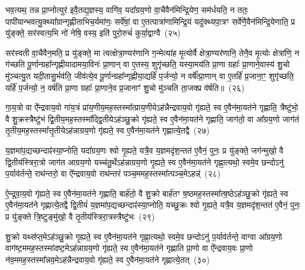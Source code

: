 भव॒त्यथ॒ तन्न प्रा॒प्नोत्युर॑ इवै॒तद्य॒ज्ञस्य॒ वागि॑व॒ यदा᳚ग्रय॒णो वा॒चैवैन॑मिन्द्रि॒येण॒ सम॑र्धयति॒ न ततः॒ पापी॑यान्भव\-त्यु॒क्थ्या᳚ग्रान्गृह्णीताभिच॒र्यमा॑णः॒ सर्वे॑षां॒ वा ए॒तत्पात्रा॑णामिन्द्रि॒यं यदु॑क्थ्यपा॒त्रꣳ सर्वे॑णै॒वैन॑मिन्द्रि॒येणाति॒ प्र यु॑ङ्क्ते॒ सर॑स्वत्य॒भि नो॑ नेषि॒ वस्य॒ इति॑ पुरो॒रुचं॑ कुर्या॒द्वाग्वै~(२५)\ip

सर॑स्वती वा॒चैवैन॒मति॒ प्र यु॑ङ्क्ते॒ मा त्वत्क्षेत्रा॒ण्यर॑णानि ग॒न्मेत्या॑ह मृ॒त्योर्वै क्षेत्रा॒ण्यर॑णानि॒ तेनै॒व मृ॒त्योः क्षेत्रा॑णि॒ न ग॑च्छति पू॒र्णान्ग्रहा᳚न्गृह्णीयादामया॒विनः॑ प्रा॒णान् वा ए॒तस्य॒ शुगृ॑च्छति॒ यस्या॒मय॑ति प्रा॒णा ग्रहाः᳚ प्रा॒णाने॒वास्य॑ शु॒चो मु॑ञ्चत्यु॒त यदी॒तासु॒र्भव॑ति॒ जीव॑त्ये॒व पू॒र्णान्ग्रहा᳚न्गृह्णीया॒द्यर्\mbox{}हि॑ प॒र्जन्यो॒ न वर्\mbox{}षे᳚त्प्रा॒णान् वा ए॒तर्\mbox{}हि॑ प्र॒जाना॒ꣳ॒ शुगृ॑च्छति॒ यर्\mbox{}हि॑ प॒र्जन्यो॒ न॒ वर्\mbox{}ष॑ति प्रा॒णा ग्रहाः᳚ प्रा॒णाने॒व प्र॒जानाꣳ॑ शु॒चो मु॑ञ्चति ता॒जक्प्र व॑र्\mbox{}षति॥~(२६)\ip

{\anuvakamend[{प्र॒मीये॑त मनु॒ष्य॑ ऋध्यते॒ यस्य॑ पि॒ता पि॑ताम॒हः पुण्यो॒ वाग्वा ए॒व पू॒र्णान्ग्रहा॒न्पञ्च॑विꣳशतिश्च}]}

गा॒य॒त्रो वा ऐ᳚न्द्रवाय॒वो गा॑य॒त्रं प्रा॑य॒णीय॒मह॒स्तस्मा᳚त्प्राय॒णीये\-ऽह॑न्नैन्द्रवाय॒वो गृ॑ह्यते॒ स्व ए॒वैन॑मा॒यत॑ने गृह्णाति॒ त्रैष्टु॑भो॒ वै शु॒क्रस्त्रैष्टु॑भं द्वि॒तीय॒मह॒स्तस्मा᳚द्\-द्वि॒तीये\-ऽह॑ञ्छु॒क्रो गृ॑ह्यते॒ स्व ए॒वैन॑मा॒यत॑ने गृह्णाति॒ जाग॑तो॒ वा आ᳚ग्रय॒णो जाग॑तं तृ॒तीय॒मह॒स्तस्मा᳚त्तृ॒तीये\-ऽह॑न्नाग्रय॒णो गृ॑ह्यते॒ स्व ए॒वैन॑मा॒यत॑ने गृह्णात्ये॒तद्वै~(२७)\ip

य॒ज्ञमा॑प॒द्यच्छन्दाꣴ॑स्या॒प्नोति॒ यदा᳚ग्रय॒णः श्वो गृ॒ह्यते॒ यत्रै॒व य॒ज्ञमदृ॑श॒न्तत॑ ए॒वैनं॒ पुनः॒ प्र यु॑ङ्क्ते॒ जग॑न्मुखो॒ वै द्वि॒तीय॑स्त्रिरा॒त्रो जाग॑त आग्रय॒णो यच्च॑तु॒र्थे\-ऽह॑न्नाग्रय॒णो गृ॒ह्यते॒ स्व ए॒वैन॑मा॒यत॑ने गृह्णा॒त्यथो॒ स्वमे॒व छन्दो\-ऽनु॑ प॒र्याव॑र्तन्ते॒ राथ॑न्तरो॒ वा ऐ᳚न्द्रवाय॒वो राथ॑न्तरं पञ्च॒ममह॒स्तस्मा᳚त्पञ्च॒मे\-ऽहन्न्॑~(२८)\ip

ऐ॒न्द्र॒वा॒य॒वो गृ॑ह्यते॒ स्व ए॒वैन॑मा॒यत॑ने गृह्णाति॒ बार्\mbox{}ह॑तो॒ वै शु॒क्रो बार्\mbox{}ह॑तꣳ ष॒ष्ठमह॒स्तस्मा᳚त्ष॒ष्ठे\-ऽह॑ञ्छु॒क्रो गृ॑ह्यते॒ स्व ए॒वैन॑मा॒यत॑ने गृह्णात्ये॒तद्वै द्वि॒तीयं॑ य॒ज्ञमा॑प॒द्यच्छन्दाꣴ॑स्या॒प्नोति॒ यच्छु॒क्रः श्वो गृ॒ह्यते॒ यत्रै॒व य॒ज्ञमदृ॑श॒न्तत॑ ए॒वैनं॒ पुनः॒ प्र यु॑ङ्क्ते त्रि॒ष्टुङ्मु॑खो॒ वै तृ॒तीय॑स्त्रिरा॒त्रस्त्रैष्टु॑भः~(२९)\ip

शु॒क्रो यथ्स॑प्त॒मे\-ऽह॑ञ्छु॒क्रो गृ॒ह्यते॒ स्व ए॒वैन॑मा॒यत॑ने गृह्णा॒त्यथो॒ स्वमे॒व छन्दो\-ऽनु॑ प॒र्याव॑र्तन्ते॒ वाग्वा आ᳚ग्रय॒णो वाग॑ष्ट॒ममह॒स्तस्मा॑दष्ट॒मे\-ऽह॑न्नाग्रय॒णो गृ॑ह्यते॒ स्व ए॒वैन॑मा॒यत॑ने गृह्णाति प्रा॒णो वा ऐ᳚न्द्रवाय॒वः प्रा॒णो न॑व॒ममह॒स्तस्मा᳚न्नव॒मे\-ऽह॑न्नैन्द्रवाय॒वो गृ॑ह्यते॒ स्व ए॒वैन॑मा॒यत॑ने गृह्णात्ये॒तत्~(३०)\ip

